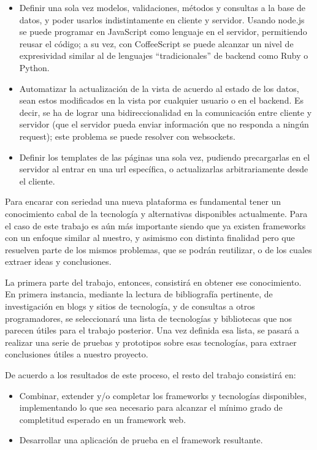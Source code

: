\documentclass[doc,helv,longtable]{article}
\begin{document}
\begin{itemize}
\item  Definir una sola vez modelos, validaciones, métodos y consultas a la base de datos, y poder usarlos indistintamente en cliente y servidor. Usando node.js\cite{node} se puede programar en JavaScript como lenguaje en el servidor, permitiendo reusar el código; a su vez, con CoffeeScript\cite{coffee} se puede alcanzar un nivel de expresividad similar al de lenguajes “tradicionales” de backend como Ruby o Python.
\item  Automatizar la actualización de la vista de acuerdo al estado de los datos, sean estos modificados en la vista por cualquier usuario o en el backend. Es decir, se ha de lograr una bidireccionalidad en la comunicación entre cliente y servidor (que el servidor pueda enviar información que no responda a ningún request); este problema se puede resolver con websockets\cite{websockets}.
\item  Definir los templates de las páginas una sola vez, pudiendo precargarlas en el servidor al entrar en una url específica, o actualizarlas arbitrariamente desde el cliente.

\end{itemize}


Para encarar con seriedad una nueva plataforma es fundamental tener un conocimiento cabal de la tecnología y alternativas disponibles actualmente. Para el caso de este trabajo es aún más importante siendo que ya existen frameworks con un enfoque similar al nuestro, y asimismo con distinta finalidad pero que resuelven parte de los mismos problemas, que se podrán reutilizar, o de los cuales extraer ideas y conclusiones. 

La primera parte del trabajo, entonces, consistirá en obtener ese conocimiento. En primera instancia, mediante la lectura de bibliografía pertinente, de investigación en blogs y sitios de tecnología, y de consultas a otros programadores, se seleccionará una lista de tecnologías y bibliotecas que nos parecen útiles para el trabajo posterior. Una vez definida esa lista, se pasará a realizar una serie de pruebas y prototipos sobre esas tecnologías, para extraer conclusiones útiles a nuestro proyecto.

De acuerdo a los resultados de este proceso, el resto del trabajo consistirá en:
\begin{itemize}
\item  Combinar, extender y/o completar los frameworks y tecnologías disponibles, implementando lo que sea necesario para alcanzar el mínimo grado de completitud esperado en un framework web.  
\item  Desarrollar una aplicación de prueba en el framework resultante.

\end{itemize}
\end{document}
